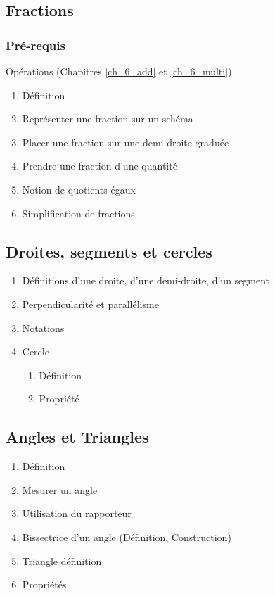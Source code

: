 \subsection{Fractions}\label{ch_6_frac}

\subsubsection{Pré-requis}
Opérations (Chapitres \ref{ch_6_add} et \ref{ch_6_multi})

\begin{enumerate}
	\item Définition
	\item Représenter une fraction sur un schéma
	\item Placer une fraction sur une demi-droite graduée
	\item Prendre une fraction d'une quantité
	\item Notion de quotients égaux
	\item Simplification de fractions
\end{enumerate}

\subsection{Droites, segments et cercles}\label{ch_6_droites}

\begin{enumerate}
	\item Définitions d'une droite, d'une demi-droite, d'un segment
	\item Perpendicularité et parallélisme
	\item Notations
	\item Cercle
		\begin{enumerate}
			\item Définition
			\item Propriété
		\end{enumerate}
\end{enumerate}

\subsection{Angles et Triangles}\label{ch_6_angles}

\begin{enumerate}
	\item Définition
	\item Mesurer un angle
	\item Utilisation du rapporteur
	\item Bissectrice d'un angle (Définition, Construction)
	\item Triangle définition
	\item Propriétés
\end{enumerate}

